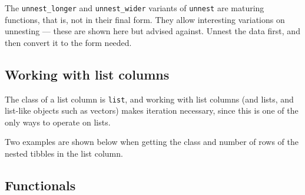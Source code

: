 \documentclass[]{book}
\newenvironment{Shaded}{}{}
\newcommand{\CommentTok}[1]{\textcolor[rgb]{0.38,0.63,0.69}{\textit{#1}}}
\newcommand{\ControlFlowTok}[1]{\textcolor[rgb]{0.00,0.44,0.13}{\textbf{#1}}}
\newcommand{\DataTypeTok}[1]{\textcolor[rgb]{0.56,0.13,0.00}{#1}}
\newcommand{\DecValTok}[1]{\textcolor[rgb]{0.25,0.63,0.44}{#1}}
\newcommand{\KeywordTok}[1]{\textcolor[rgb]{0.00,0.44,0.13}{\textbf{#1}}}
\newcommand{\NormalTok}[1]{#1}
\newcommand{\OperatorTok}[1]{\textcolor[rgb]{0.40,0.40,0.40}{#1}}
\begin{document}
The \texttt{unnest\_longer} and \texttt{unnest\_wider} variants of \texttt{unnest} are maturing functions, that is, not in their final form. They allow interesting variations on unnesting --- these are shown here but advised against.
Unnest the data first, and then convert it to the form needed.

\hypertarget{working-with-list-columns}{%
\subsection{Working with list columns}\label{working-with-list-columns}}

The class of a list column is \texttt{list}, and working with list columns (and lists, and list-like objects such as vectors) makes iteration necessary, since this is one of the only ways to operate on lists.

Two examples are shown below when getting the class and number of rows of the nested tibbles in the list column.

\begin{Shaded}
\end{Shaded}

\hypertarget{functionals}{%
\subsection*{Functionals}\label{functionals}}
\end{document}

